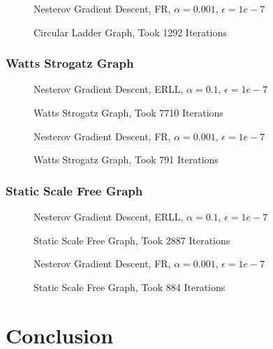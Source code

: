\documentclass[12pt]{article}
\begin{document}
\begin{figure}[H]
\centering
Nesterov Gradient Descent, FR, $\alpha=0.001$, $\epsilon=1e-7$

\caption{\label{circular-ladder-nesterov-fr} Circular Ladder Graph, Took 1292 Iterations}
\end{figure}

\subsubsection{Watts Strogatz Graph}

\begin{figure}[H]
\centering
Nesterov Gradient Descent, ERLL, $\alpha=0.1$, $\epsilon=1e-7$

\caption{\label{watts-strogatz-nesterov-erll} Watts Strogatz Graph, Took 7710 Iterations}
\end{figure}

\begin{figure}[H]
\centering
Nesterov Gradient Descent, FR, $\alpha=0.001$, $\epsilon=1e-7$

\caption{\label{watts-strogatz-nesterov-fr} Watts Strogatz Graph, Took 791 Iterations}
\end{figure}

\subsubsection{Static Scale Free Graph}

\begin{figure}[H]
\centering
Nesterov Gradient Descent, ERLL, $\alpha=0.1$, $\epsilon=1e-7$

\caption{\label{static-scale-free-nesterov-erll} Static Scale Free Graph, Took 2887 Iterations}
\end{figure}

\begin{figure}[H]
\centering
Nesterov Gradient Descent, FR, $\alpha=0.001$, $\epsilon=1e-7$

\caption{\label{static-scale-free-nesterov-fr} Static Scale Free Graph, Took 884 Iterations}
\end{figure}

\section{Conclusion}
\end{document}
